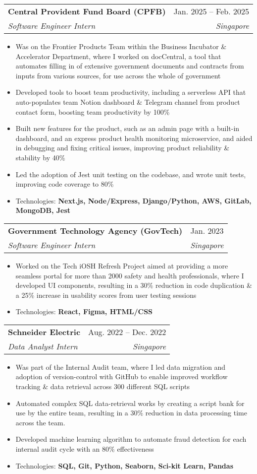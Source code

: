 \documentclass[letterpaper,11pt]{article}
\makeatletter
\newcommand{\resumeItem}[1]{
  \item\small{
    {#1 \vspace{-2pt}}
  }
}
\newcommand{\resumeSubheading}[4]{
  \vspace{-2pt}\item
    \begin{tabular*}{0.97\textwidth}[t]{l@{\extracolsep{\fill}}r}
      \textbf{#1} & #2 \\
      \textit{\small#3} & \textit{\small #4} \\
    \end{tabular*}\vspace{-7pt}
}
\newcommand{\resumeItemListStart}{\begin{itemize}}
\newcommand{\resumeItemListEnd}{\end{itemize}\vspace{-5pt}}
\makeatother
\begin{document}
    \resumeSubheading
    {Central Provident Fund Board (CPFB)}{Jan. 2025 -- Feb. 2025}
    {Software Engineer Intern}{Singapore}
    \resumeItemListStart
      \resumeItem{Was on the Frontier Products Team within the Business Incubator \& Accelerator Department, where I worked on docCentral, a tool that automates filling in of extensive government documents and contracts from inputs from various sources, for use across the whole of government}
      \resumeItem{Developed tools to boost team productivity, including a serverless API that auto-populates team Notion dashboard \& Telegram channel from product contact form, boosting team productivity by 100\%} 
      \resumeItem{Built new features for the product, such as an admin page with a built-in dashboard, and an express product health monitoring microservice, and aided in debugging and fixing critical issues, improving product reliability \& stability by 40\%}
      \resumeItem{Led the adoption of Jest unit testing on the codebase, and wrote unit tests, improving code coverage to 80\%}
      \resumeItem{Technologies: \textbf{Next.js, Node/Express, Django/Python, AWS, GitLab, MongoDB, Jest}}
    \resumeItemListEnd

    \resumeSubheading
      {Government Technology Agency (GovTech)}{Jan. 2023}
      {Software Engineer Intern}{Singapore}
      \resumeItemListStart
        \resumeItem{Worked on the Tech iOSH Refresh Project aimed at providing a more seamless portal for more than 2000 safety and health professionals, where I developed UI components, resulting in a 30\% reduction in code duplication \& a 25\% increase in usability scores from user testing sessions}
        \resumeItem{Technologies: \textbf{React, Figma, HTML/CSS}}
      \resumeItemListEnd

    \resumeSubheading
      {Schneider Electric}{Aug. 2022 -- Dec. 2022}
      {Data Analyst Intern}{Singapore}
      \resumeItemListStart
        \resumeItem{Was part of the Internal Audit team, where I led data migration and adoption of version-control with GitHub to enable improved workflow tracking \& data retrieval across 300 different SQL scripts}
        \resumeItem{Automated complex SQL data-retrieval works by creating a script bank for use by the entire team, resulting in a 30\% reduction in data processing time across the team.}
        \resumeItem{Developed machine learning algorithm to automate fraud detection for each internal audit cycle with an 80\% effectiveness}
        \resumeItem{Technologies: \textbf{SQL, Git, Python, Seaborn, Sci-kit Learn, Pandas}}
      \resumeItemListEnd
\end{document}
